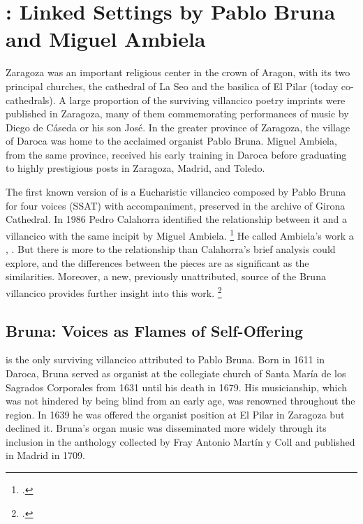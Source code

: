 \section{: Linked Settings by Pablo Bruna
and Miguel Ambiela}

Zaragoza was an important religious center in the crown of Aragon, with its two
principal churches, the cathedral of La Seo and the basilica of El Pilar (today
co-cathedrals).%
    \Autocite{Ezquerro:CatalogoZaragoza}
A large proportion of the surviving villancico poetry imprints were published
in Zaragoza, many of them commemorating performances of music by Diego de
Cáseda or his son José.
In the greater province of Zaragoza, the village of Daroca was home to the
acclaimed organist Pablo Bruna.  
Miguel Ambiela, from the same province, received his early training in Daroca
before graduating to highly prestigious posts in Zaragoza, Madrid, and Toledo.

The first known version of  is a Eucharistic
villancico composed by Pablo Bruna for four voices (SSAT) with accompaniment,
preserved in the archive of Girona Cathedral.%
    \Autocite{Calahorra:Suban}
In 1986 Pedro Calahorra identified the relationship between it and a 
villancico with the same incipit by Miguel Ambiela.%
    \footnote{.}
He called Ambiela's work a , .%
    \Autocite[9]{Calahorra:Suban}
But there is more to the relationship than Calahorra's brief analysis could
explore, and the differences between the pieces are as significant as the
similarities.
Moreover, a new, previously unattributed, source of the Bruna villancico
provides further insight into this work.%
    \footnote{.}

\subsection{Bruna: Voices as Flames of Self-Offering}

 is the only surviving villancico attributed to Pablo
Bruna.
Born in 1611 in Daroca, Bruna served as organist at the collegiate church of
Santa María de los Sagrados Corporales from 1631 until his death in 1679.%
    \Autocite[104]{Calahorra:Aragon}
His musicianship, which was not hindered by being blind from an early age, was
renowned throughout the region.
In 1639 he was offered the organist position at El Pilar in Zaragoza but
declined it.%
    \Autocite[123--125]{Calahorra:Aragon}
Bruna's organ music was disseminated more widely through its inclusion in the
anthology  collected by Fray
Antonio Martín y Coll and published in Madrid in 1709.

